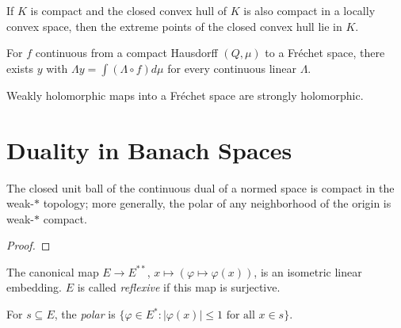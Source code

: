 \begin{theorem}
  \label{thm:milman}
  \leanok
  If $K$ is compact and the closed convex hull of $K$ is also compact
  in a locally convex space, then the extreme points of the closed
  convex hull lie in $K$.
\end{theorem}

\begin{theorem}
  \label{thm:vector-integral}
  \leanok
  For $f$ continuous from a compact Hausdorff $(Q, \mu)$ to a Fréchet
  space, there exists $y$ with $\Lambda y = \int (\Lambda \circ f)
  d\mu$ for every continuous linear $\Lambda$.
\end{theorem}

\begin{theorem}
  \label{thm:weak-holomorphic-strong}
  \leanok
  Weakly holomorphic maps into a Fréchet space are strongly
  holomorphic.
\end{theorem}

\chapter{Duality in Banach Spaces}

\begin{theorem}
  \label{thm:banach-alaoglu}
  \leanok
  The closed unit ball of the continuous dual of a normed space is
  compact in the weak-$*$ topology; more generally, the polar of any
  neighborhood of the origin is weak-$*$ compact.
\end{theorem}
\begin{proof}
  \leanok
\end{proof}

\begin{definition}
  \label{def:double-dual-embedding}
  \leanok
  The canonical map $E \to E^{**}$, $x \mapsto (\varphi \mapsto \varphi(x))$,
  is an isometric linear embedding. $E$ is called \emph{reflexive} if
  this map is surjective.
\end{definition}

\begin{definition}
  \label{def:polar}
  \leanok
  For $s \subseteq E$, the \emph{polar} is
  $\{\varphi \in E^{*} : |\varphi(x)| \le 1 \text{ for all } x \in s\}$.
\end{definition}

